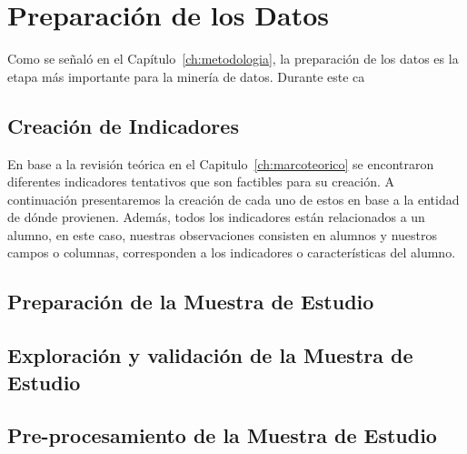\section{Preparación de los Datos}
Como se señaló en el Capítulo~\ref{ch:metodologia}, la preparación de los datos es la etapa más importante para la minería de datos. Durante este ca
\subsection{Creación de Indicadores}
En base a la revisión teórica en el Capitulo~\ref{ch:marcoteorico} se encontraron diferentes indicadores tentativos que son factibles para su creación.
A continuación presentaremos la creación de cada uno de estos en base a la entidad de dónde provienen. Además, todos los indicadores están relacionados a un alumno, en este caso, nuestras observaciones consisten en alumnos y nuestros campos o columnas, corresponden a los indicadores o características del alumno.
\subsection{Preparación de la Muestra de Estudio}
\subsection{Exploración y validación de la Muestra de Estudio}
\subsection{Pre-procesamiento de la Muestra de Estudio}



